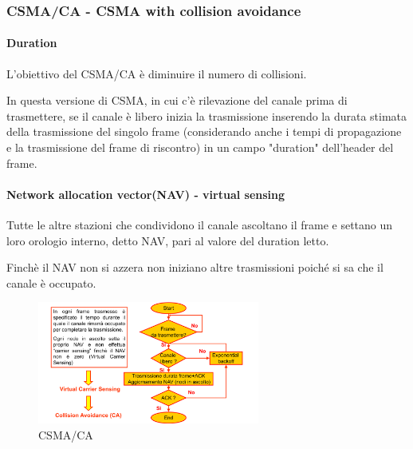\subsubsection{CSMA/CA - CSMA with collision avoidance}
\paragraph{Duration}
L'obiettivo del CSMA/CA è diminuire il numero di collisioni.

In questa versione di CSMA, in cui c'è rilevazione del canale prima di trasmettere, se il canale è libero inizia la trasmissione inserendo la durata stimata della trasmissione del singolo frame (considerando anche i tempi di propagazione e la trasmissione del frame di riscontro) in un campo "duration" dell'header del frame.

\paragraph{Network allocation vector(NAV) - virtual sensing} Tutte le altre stazioni che condividono il canale ascoltano il frame e settano un
loro orologio interno, detto NAV, pari al valore del duration letto.

Finchè il NAV non si azzera non iniziano altre trasmissioni poiché si sa che il canale è occupato.
\begin{figure}[htbp]
    \centering
    \includegraphics[width=0.65\textwidth]{images/csmaca.png}
    \caption{CSMA/CA}
    \label{fig:csma-ca}
\end{figure}
